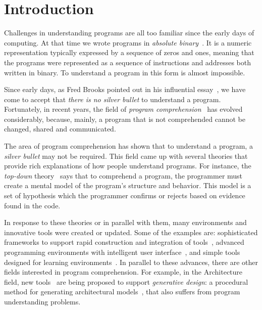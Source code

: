 
% 
% 

\section{Introduction}

Challenges in understanding programs are all too familiar since the early days of computing. At that time we wrote programs in \textit{absolute binary}~\cite{hamming2003art}. It is a numeric representation typically expressed by a sequence of zeros and ones, meaning that the programs were represented as a sequence of instructions and addresses both written in binary. To understand a program in this form is almost impossible.

Since early days, as Fred Brooks pointed out in his influential essay~\cite{bullet1987essence}, we have come to accept that \textit{there is no silver bullet} to understand a program. Fortunately, in recent years, the field of \textit{program comprehension}~\cite{rugaber1995program} has evolved considerably, because, mainly, a program that is not comprehended cannot be changed, shared and communicated.

The area of program comprehension has shown that to understand a program, a \textit{silver bullet} may not be required. This field came up with several theories that provide rich explanations of how people understand programs. For instance, the \textit{top-down} theory~\cite{brooks1977towards} says that to comprehend a program, the programmer must create a mental model of the program's structure and behavior. This model is a set of hypothesis which the programmer confirms or rejects based on evidence found in the code.

In response to these theories or in parallel with them, many environments and innovative tools were created or updated. Some of the examples are: sophisticated frameworks to support rapid construction and integration of tools~\cite{DesRivieres2004}, advanced programming environments with intelligent user interface~\cite{carlson2005eclipse,boudreau2002netbeans,intellij2001intellij,guckenheimer2006software}, and simple tools designed for learning environments~\cite{papert1980mindstorms,Kay1993,Reas2006,findler2002drscheme,GuoSIGCSE2013,mcdirmid2013usable}. In parallel to these advances, there are other fields interested in program comprehension. For example, in the Architecture field, new tools~\cite{aish2012designscript,lopes2011portable} are being proposed to support \textit{generative design}: a procedural method for generating architectural models~\cite{mccormack2004generative}, that also suffers from program understanding problems.

